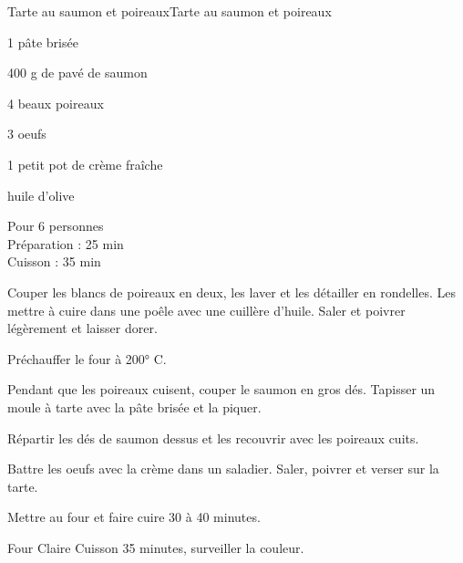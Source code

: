 \begin{recette}{Tarte au saumon et poireaux}{Tarte au saumon et poireaux}

\begin{ingredients}
1 pâte brisée\par
400 g de pavé de saumon\par
4 beaux poireaux\par
3 oeufs\par
1 petit pot de crème fraîche\par
huile d'olive\par
\end{ingredients}

\begin{infos}
Pour 6 personnes\\
Préparation : 25 min\\
Cuisson : 35 min\\
\end{infos}

\begin{etapes}
\item Couper les blancs de poireaux en deux, les laver et les détailler en rondelles. Les mettre à cuire dans une poêle avec une cuillère d'huile. Saler et poivrer légèrement et laisser dorer.
\item Préchauffer le four à 200° C.
\item Pendant que les poireaux cuisent, couper le saumon en gros dés. Tapisser un moule à tarte avec la pâte brisée et la piquer.
\item Répartir les dés de saumon dessus et les recouvrir avec les poireaux cuits.
\item Battre les oeufs avec la crème dans un saladier. Saler, poivrer et verser sur la tarte.
\item Mettre au four et faire cuire 30 à 40 minutes.
\end{etapes}

\begin{conseils}
Four Claire Cuisson 35 minutes, surveiller la couleur.
\end{conseils}

\end{recette}